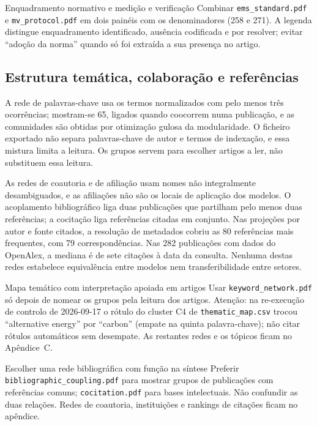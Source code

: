 {Enquadramento normativo e medição e verificação}
{Combinar \texttt{ems\_standard.pdf} e \texttt{mv\_protocol.pdf} em dois
painéis com os denominadores (258 e 271). A legenda distingue enquadramento
identificado, ausência codificada e por resolver; evitar ``adoção da norma''
quando só foi extraída a sua presença no artigo.}%

\subsection{Estrutura temática, colaboração e referências}
\label{sec:temas-colaboracao}

A rede de palavras-chave usa os termos normalizados com pelo menos três
ocorrências; mostram-se 65, ligados quando coocorrem numa publicação, e as
comunidades são obtidas por otimização gulosa da modularidade. O ficheiro
exportado não separa palavras-chave de autor e termos de indexação, e essa
mistura limita a leitura. Os grupos servem para escolher artigos a ler, não
substituem essa leitura.

As redes de coautoria e de afiliação usam nomes não integralmente
desambiguados, e as afiliações não são os locais de aplicação dos modelos.
O acoplamento bibliográfico liga duas publicações que partilham pelo menos
duas referências; a cocitação liga referências citadas em conjunto. Nas
projeções por autor e fonte citados, a resolução de metadados cobriu as 80
referências mais frequentes, com 79 correspondências. Nas 282 publicações
com dados do OpenAlex, a mediana é de sete citações à data da consulta.
Nenhuma destas redes estabelece equivalência entre modelos nem
transferibilidade entre setores.

{Mapa temático com interpretação apoiada em artigos}
{Usar \texttt{keyword\_network.pdf} só depois de nomear os grupos pela
leitura dos artigos. Atenção: na re-execução de controlo de 2026-09-17 o
rótulo do cluster C4 de \texttt{thematic\_map.csv} trocou ``alternative
energy'' por ``carbon'' (empate na quinta palavra-chave); não citar
rótulos automáticos sem desempate. As restantes redes e os tópicos ficam
no Apêndice~C.}%

{Escolher uma rede bibliográfica com função na síntese}
{Preferir \texttt{bibliographic\_coupling.pdf} para mostrar grupos de
publicações com referências comuns; \texttt{cocitation.pdf} para bases
intelectuais. Não confundir as duas relações. Redes de coautoria,
instituições e rankings de citações ficam no apêndice.}%


